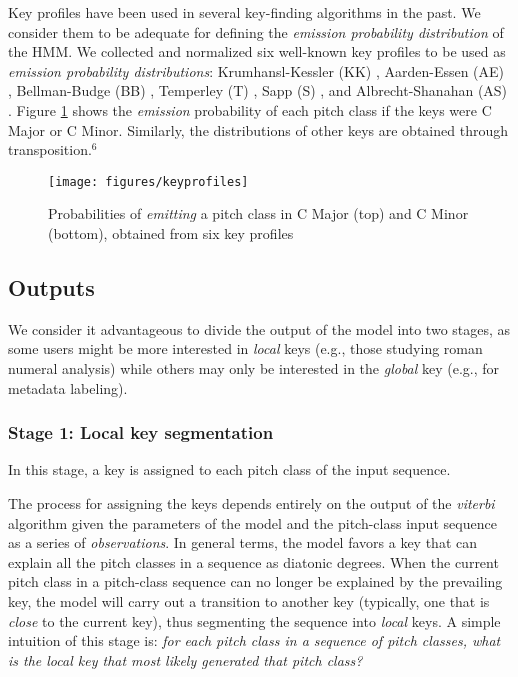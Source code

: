 \documentclass[sigconf]{acmart}
\begin{document}
Key profiles have been used in several key-finding algorithms in the past. We consider them to be adequate for defining the \emph{emission probability distribution} of the HMM. We collected and normalized six well-known key profiles to be used as \emph{emission probability distributions}: Krumhansl-Kessler (KK) \cite{krumhansl1982}, Aarden-Essen (AE) \cite{aarden2003dynamic}, Bellman-Budge (BB) \cite{bellman06}, Temperley (T) \cite{temperley2002}, Sapp (S) \cite{sapp2011computational}, and Albrecht-Shanahan (AS) \cite{albrecht2013use}. Figure \ref{fig:keyprofiles} shows the \emph{emission} probability of each pitch class if the keys were C Major or C Minor. Similarly, the distributions of other keys are obtained through transposition.$^{6}$

\begin{figure}[ht]
  \centering
  \texttt{[image: figures/keyprofiles]}
  \caption{Probabilities of \emph{emitting} a pitch class in C Major (top) and C Minor (bottom), obtained from six key profiles}
  \label{fig:keyprofiles}
\end{figure}

\subsection{Outputs}
We consider it advantageous to divide the output of the model into two stages, as some users might be more interested in \emph{local} keys (e.g., those studying roman numeral analysis) while others may only be interested in the \emph{global} key (e.g., for metadata labeling).

\subsubsection{Stage 1: Local key segmentation}
In this stage, a key is assigned to each pitch class of the input sequence.

The process for assigning the keys depends entirely on the output of the \emph{viterbi} algorithm \cite{forney1973viterbi} given the parameters of the model and the pitch-class input sequence as a series of \emph{observations}. In general terms, the model favors a key that can explain all the pitch classes in a sequence as diatonic degrees. When the current pitch class in a pitch-class sequence can no longer be explained by the prevailing key, the model will carry out a transition to another key (typically, one that is \emph{close} to the current key), thus segmenting the sequence into \emph{local} keys. A simple intuition of this stage is: \emph{for each pitch class in a sequence of pitch classes, what is the local key that most likely generated that pitch class?}
\end{document}
